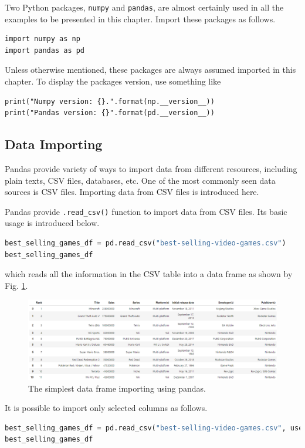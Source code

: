 Two Python packages, \verb|numpy| and \verb|pandas|, are almost certainly used in all the examples to be presented in this chapter. Import these packages as follows.
\begin{lstlisting}
import numpy as np
import pandas as pd
\end{lstlisting}
Unless otherwise mentioned, these packages are always assumed imported in this chapter. To display the packages version, use something like
\begin{lstlisting}
print("Numpy version: {}.".format(np.__version__))
print("Pandas version: {}".format(pd.__version__))
\end{lstlisting}

\subsection{Data Importing}

Pandas provide variety of ways to import data from different resources, including plain texts, CSV files, databases, etc. One of the most commonly seen data sources is CSV files. Importing data from CSV files is introduced here.

Pandas provide \verb|.read_csv()| function to import data from CSV files. Its basic usage is introduced below.
\begin{lstlisting}[language=python]
best_selling_games_df = pd.read_csv("best-selling-video-games.csv")
best_selling_games_df
\end{lstlisting}
which reads all the information in the CSV table into a data frame as shown by Fig. \ref{fig:dfexp}.
\begin{figure}[htbp]
	\centering
	\includegraphics[width=\textwidth]{chapters/part-3/figures/df_example.png}
	\caption{The simplest data frame importing using pandas.}
	\label{fig:dfexp}
\end{figure}
It is possible to import only selected columns as follows.
\begin{lstlisting}[language=python]
best_selling_games_df = pd.read_csv("best-selling-video-games.csv", usecols = ["Title", "Sales", "Publisher(s)"])
best_selling_games_df
\end{lstlisting}

